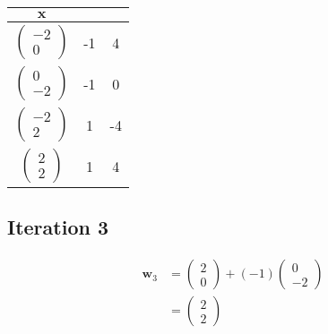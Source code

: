 \documentclass[11pt, a4paper]{article}
\begin{document}
\begin{table}[htbp]
	\centering
	\begin{tabular}{|c|c|c|}
		\toprule
		$\boldsymbol{x}$    \\
		\midrule
		$\begin{pmatrix} -2 \\ 0 \end{pmatrix}$ & -1 & 4 \\
		$\begin{pmatrix} 0  \\ -2 \end{pmatrix}$ & -1 & 0 \\
		$\begin{pmatrix} -2 \\ 2 \end{pmatrix}$ & 1 & -4 \\
		$\begin{pmatrix} 2  \\ 2 \end{pmatrix}$ & 1 & 4 \\
		\hline
	\end{tabular}
\end{table}

\FloatBarrier

\subsection{Iteration 3}

\begin{align*}
	\boldsymbol{w}_3 & = \begin{pmatrix} 2 \\ 0 \end{pmatrix} + (-1)  \begin{pmatrix} 0 \\ -2 \end{pmatrix}  \\
	                 & = \begin{pmatrix} 2 \\ 2 \end{pmatrix}
\end{align*}
\end{document}
